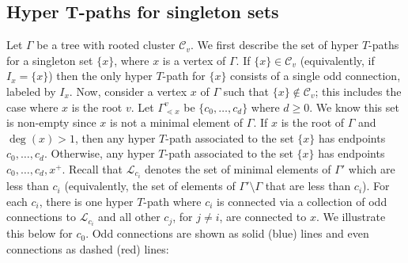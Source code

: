 \documentclass[10pt,a4paper]{amsart}
\numberwithin{equation}{section}
\begin{document}
\subsection[Hyper T-paths for singleton sets]{Hyper $\boldsymbol{T}$-paths for singleton sets}\label{sec:single-sets}
Let $\Gamma$ be a tree with rooted cluster $\mathcal{C}_{v}$. We first describe the set of hyper $T$-paths for a singleton set $\{x\}$, where $x$ is a vertex of $\Gamma$.
If $\{x\} \in \mathcal{C}_v$ (equivalently, if $I_{x} = \{x\}$) then the only hyper $T$-path for $\{x\}$ consists of a single odd connection, labeled by $I_{x}$. Now, consider a vertex $x$ of $\Gamma$ such that $\{x\} \notin \mathcal{C}_v$; this includes the case where $x$ is the root $v$.
Let $\Gamma_{\lessdot x}^v$ be $\{c_0,\ldots,c_d\}$ where $d \geq 0$. We know this set is non-empty since $x$ is not a minimal element of $\Gamma$. If $x$ is the root of $\Gamma$ and $\deg(x) > 1$, then any hyper $T$-path associated to the set $\{x\}$ has endpoints $c_0,\ldots,c_d$. Otherwise, any hyper $T$-path associated to the set $\{x\}$ has endpoints $c_0,\ldots,c_d,x^+$.
Recall that $\mathcal{L}_{c_i}$ denotes the set of minimal elements of $\Gamma'$ which are less than $c_i$ (equivalently, the set of elements of $\Gamma' \setminus \Gamma$ that are less than $c_i$). For each $c_i$, there is one hyper $T$-path where $c_i$ is connected via a collection of odd connections to $\mathcal{L}_{c_i}$ and all other $c_j$, for $j \neq i$, are connected to $x$. We illustrate this below for $c_0$. Odd connections are shown as solid (blue) lines and even connections as dashed (red) lines:
\end{document}
